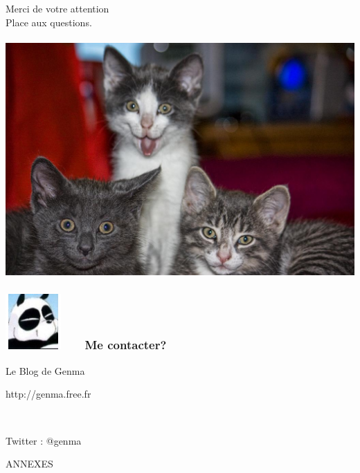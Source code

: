\documentclass{beamer}
\begin{document}
\begin{frame}
\begin{center}
\Huge{Merci de votre attention}
\\
\Huge{Place aux questions.}
\\~\\
\includegraphics[scale=0.2] {./images/chat.jpg}
\end{center}
\end{frame}

\begin{frame}
\frametitle{\includegraphics[scale=0.4]{./images/Genma.jpg} \ \ \  Me contacter?}
\Huge{\centerline{Le Blog de Genma}}
\Huge{\centerline{http://genma.free.fr}}
\Huge{\centerline{~}}
\Huge{\centerline{Twitter : @genma}}
\end{frame}

\begin{frame}
\Huge{\centerline{ANNEXES}}
\end{frame}
\end{document}
